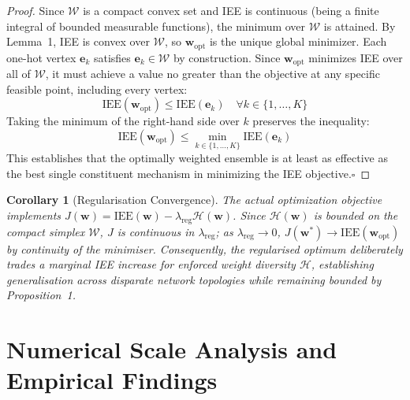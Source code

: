 \documentclass[conference]{IEEEtran}
\newtheorem{corollary}{Corollary}
\begin{document}
\begin{proof}
Since $\mathcal{W}$ is a compact convex set and IEE is continuous (being a finite
integral of bounded measurable functions), the minimum over $\mathcal{W}$ is attained.
By Lemma~1, IEE is convex over $\mathcal{W}$, so $\mathbf{w}_{\mathrm{opt}}$ is the
unique global minimizer. Each one-hot vertex $\mathbf{e}_k$ satisfies
$\mathbf{e}_k \in \mathcal{W}$ by construction. Since $\mathbf{w}_{\mathrm{opt}}$
minimizes IEE over all of $\mathcal{W}$, it must achieve a value no greater than the
objective at any specific feasible point, including every vertex:
\begin{equation}
  \mathrm{IEE}(\mathbf{w}_{\mathrm{opt}}) \leq \mathrm{IEE}(\mathbf{e}_k)
  \quad \forall k \in \{1, \ldots, K\}
  \label{eq:dom2}
\end{equation}
Taking the minimum of the right-hand side over $k$ preserves the inequality:
\begin{equation}
  \mathrm{IEE}(\mathbf{w}_{\mathrm{opt}}) \leq \min_{k \in \{1,\ldots,K\}} \mathrm{IEE}(\mathbf{e}_k)
  \label{eq:dom3}
\end{equation}
This establishes that the optimally weighted ensemble is at least as effective as the
best single constituent mechanism in minimizing the IEE objective.\hfill$\square$
\end{proof}

\begin{corollary}[Regularisation Convergence]
The actual optimization objective implements
$J(\mathbf{w}) = \mathrm{IEE}(\mathbf{w}) - \lambda_{\mathrm{reg}}\mathcal{H}(\mathbf{w})$.
Since $\mathcal{H}(\mathbf{w})$ is bounded on the compact simplex $\mathcal{W}$, $J$ is
continuous in $\lambda_{\mathrm{reg}}$; as $\lambda_{\mathrm{reg}} \to 0$,
$J(\mathbf{w}^*) \to \mathrm{IEE}(\mathbf{w}_{\mathrm{opt}})$ by continuity of the
minimiser. Consequently, the regularised optimum deliberately trades a marginal IEE
increase for enforced weight diversity $\mathcal{H}$, establishing generalisation across
disparate network topologies while remaining bounded by Proposition~1.
\end{corollary}

\section{Numerical Scale Analysis and Empirical Findings}
\label{sec:results}
\end{document}
